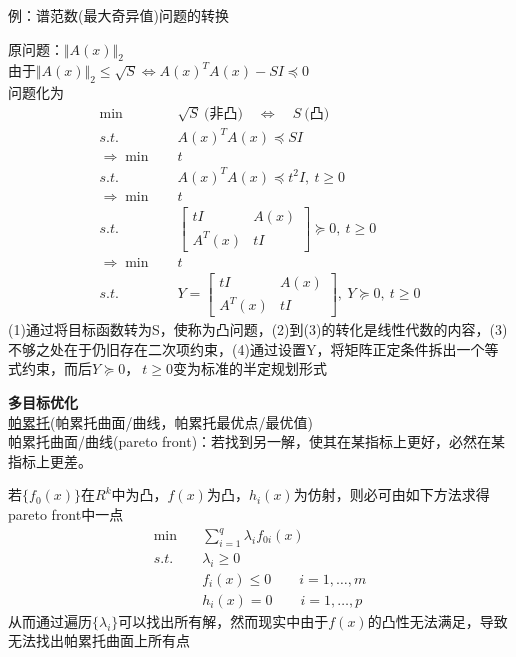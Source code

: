 \documentclass[11pt]{ctexart}         %
\newcommand{\rebacklinespread}[1][-12pt]{\vspace{#1}}
\newcommand{\oneline}[1][12pt]{\vspace{#1}}
\newcommand{\rs}[2][R]{#1^{#2}} %
\newcommand{\trans}[1]{#1^T#1} %
\newcommand{\ba}[1]{\begin{align*}#1\end{align*}}
\newcommand{\li}[3][例]{
	#1：#2\\ 
	\phantom{#1：}\begin{minipage}[t]{0.9\linewidth}%
	\setlength\parskip{12pt}
	#3
	\end{minipage}
	\oneline}
\newcommand{\paint}[2][red]{{\color{#1}#2}} %
\newcommand{\VV}[1]{\Vert #1 \Vert}
\begin{document}
\newpage
\li{谱范数(最大奇异值)问题的转换}{
	原问题：$ \Vert A(x)\Vert_2 $\\
	由于$ \VV{A(x)}_2\leq \sqrt{S}\Leftrightarrow \trans{A(x)}-SI\preceq 0$\\
	问题化为
	\rebacklinespread
	\ba{
		\min\quad&\sqrt{S}\ \text{(非凸)}\quad\Leftrightarrow\quad S\ \text{(凸)} \tag{1} \\
		s.t.\quad &\trans{A(x)}\preceq SI\\
		\Rightarrow\min\quad &t\\
		s.t.\quad&\trans{A(x)}\preceq t^2I,\ t\geq 0 \tag{2} \\ 
		\Rightarrow\min\quad &t\\
		s.t.\quad &\left[
		\begin{array}{cc}
			tI&A(x)  \\
			A^T(x)&tI 
		\end{array}\right]\succeq 0,\ t\geq 0 \tag{3} \\
		\Rightarrow \min\quad &t\\
		s.t.\quad &Y=\left[
		\begin{array}{cc}
			tI&A(x)  \\
			A^T(x)&tI 
		\end{array}\right],\ Y\succeq 0,\ t\geq 0\tag{4}
	}
	(1)通过将目标函数转为S，使称为凸问题，(2)到(3)的转化是线性代数的内容，(3)不够之处在于仍旧存在二次项约束，(4)通过设置Y，将矩阵正定条件拆出一个等式约束，而后$ Y\succeq 0，\ t\geq0 $变为标准的半定规划形式
}

\textbf{多目标优化}\\
\href{https://hpzhao.github.io/2018/09/17/%E5%A4%9A%E7%9B%AE%E6%A0%87%E4%BC%98%E5%8C%96%E5%9B%9B%E7%A7%8D%E6%96%B9%E6%B3%95/}{\paint[blue]{帕累托}}(帕累托曲面/曲线，帕累托最优点/最优值)\\
帕累托曲面/曲线(pareto front)：若找到另一解，使其在某指标上更好，必然在某指标上更差。

若$ \{f_0(x)\} $在$ \rs{k} $中为凸，$ f(x) $为凸，$ h_i(x) $为仿射，则必可由如下方法求得pareto front中一点
\rebacklinespread
\ba{\min\quad &\sum_{i=1}^{q}\lambda_i f_{0i}(x)\\s.t.\quad &\lambda_i\geq0\\&f_i(x)\leq 0\qquad i=1,\dots,m\\&h_i(x)=0\qquad i=1,\dots,p}
从而通过遍历$ \{\lambda_i\} $可以找出所有解，然而现实中由于$ f(x) $的凸性无法满足，导致无法找出帕累托曲面上所有点
\end{document}
